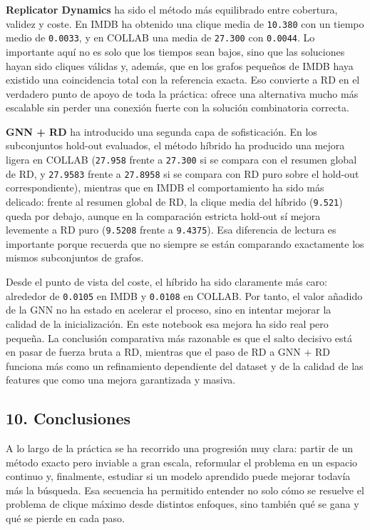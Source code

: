 \documentclass[11pt]{article}
\begin{document}
\textbf{Replicator Dynamics} ha sido el método más equilibrado entre
cobertura, validez y coste. En IMDB ha obtenido una clique media de
\texttt{10.380} con un tiempo medio de \texttt{0.0033}, y en COLLAB una
media de \texttt{27.300} con \texttt{0.0044}. Lo importante aquí no es
solo que los tiempos sean bajos, sino que las soluciones hayan sido
cliques válidas y, además, que en los grafos pequeños de IMDB haya
existido una coincidencia total con la referencia exacta. Eso convierte
a RD en el verdadero punto de apoyo de toda la práctica: ofrece una
alternativa mucho más escalable sin perder una conexión fuerte con la
solución combinatoria correcta.

\textbf{GNN + RD} ha introducido una segunda capa de sofisticación. En
los subconjuntos hold-out evaluados, el método híbrido ha producido una
mejora ligera en COLLAB (\texttt{27.958} frente a \texttt{27.300} si se
compara con el resumen global de RD, y \texttt{27.9583} frente a
\texttt{27.8958} si se compara con RD puro sobre el hold-out
correspondiente), mientras que en IMDB el comportamiento ha sido más
delicado: frente al resumen global de RD, la clique media del híbrido
(\texttt{9.521}) queda por debajo, aunque en la comparación estricta
hold-out sí mejora levemente a RD puro (\texttt{9.5208} frente a
\texttt{9.4375}). Esa diferencia de lectura es importante porque
recuerda que no siempre se están comparando exactamente los mismos
subconjuntos de grafos.

Desde el punto de vista del coste, el híbrido ha sido claramente más
caro: alrededor de \texttt{0.0105} en IMDB y \texttt{0.0108} en COLLAB.
Por tanto, el valor añadido de la GNN no ha estado en acelerar el
proceso, sino en intentar mejorar la calidad de la inicialización. En
este notebook esa mejora ha sido real pero pequeña. La conclusión
comparativa más razonable es que el salto decisivo está en pasar de
fuerza bruta a RD, mientras que el paso de RD a GNN + RD funciona más
como un refinamiento dependiente del dataset y de la calidad de las
features que como una mejora garantizada y masiva.

    \subsection{10. Conclusiones}\label{conclusiones}

A lo largo de la práctica se ha recorrido una progresión muy clara:
partir de un método exacto pero inviable a gran escala, reformular el
problema en un espacio continuo y, finalmente, estudiar si un modelo
aprendido puede mejorar todavía más la búsqueda. Esa secuencia ha
permitido entender no solo cómo se resuelve el problema de clique máximo
desde distintos enfoques, sino también qué se gana y qué se pierde en
cada paso.
\end{document}
